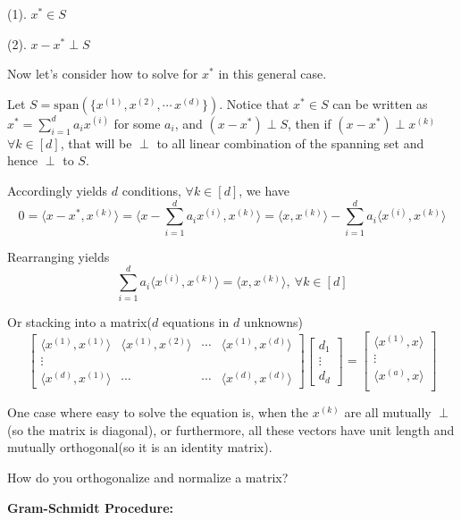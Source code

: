 (1). $x^{*} \in S$

(2). $x-x^{*}\perp S$

\vspace{0.3cm}
Now let's consider how to solve for $x^{*}$ in this general case.

Let $S=\text{span}\left(\{x^{(1)},x^{(2)},\cdots\,x^{(d)}\}\right)$. Notice that $x^{*}\in S$ can be written as $x^{*}=\sum_{i=1}^{d}a_{i}x^{(i)}$ for some $a_{i}$, and $(x-x^{*}) \perp S$, then if $(x-x^{*}) \perp x^{(k)}$ $\forall k\in [d]$, that will be $\perp$ to all linear combination of the spanning set and hence $\perp$ to $S$.

Accordingly yields $d$ conditions, $\forall k\in [d]$, we have
$$0=\langle x-x^{*},x^{(k)}\rangle=\langle x-\sum_{i=1}^{d}a_{i}x^{(i)},x^{(k)}\rangle=\langle x,x^{(k)}\rangle-\sum_{i=1}^{d}a_{i}\langle x^{(i)},x^{(k)}\rangle$$

Rearranging yields
$$\sum_{i=1}^{d}a_{i}\langle x^{(i)},x^{(k)}\rangle=\langle x,x^{(k)}\rangle ,\ \forall k\in [d]$$

Or stacking into a matrix($d$ equations in $d$ unknowns)
$$\left[ 
\begin{array}{cccc} 
\langle x^{(1)},x^{(1)}\rangle & \langle x^{(1)},x^{(2)}\rangle &\cdots& \langle x^{(1)},x^{(d)}\rangle\\
\vdots&&& \\
\langle x^{(d)},x^{(1)}\rangle & \cdots &\cdots& \langle x^{(d)},x^{(d)}\rangle
\end{array}
\right]
\left[ 
\begin{array}{c} 
d_{1}\\
\vdots\\
d_{d}
\end{array}
\right]=
\left[ 
\begin{array}{c} 
\langle x^{(1)},x\rangle\\
\vdots\\
\langle x^{(a)},x\rangle\\
\end{array}
\right]$$

One case where easy to solve the equation is, when the $x^{(k)}$ are all mutually $\perp$ (so the matrix is diagonal), or furthermore, all these vectors have unit length and mutually orthogonal(so it is an identity matrix).

\vspace{0.3cm}
How do you orthogonalize and normalize a matrix?

\textbf{Gram-Schmidt Procedure:}


